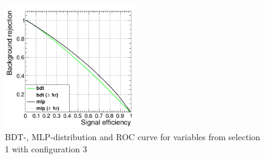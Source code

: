 \documentclass[11pt]{scrartcl}
\begin{document}
\begin{figure}[H]
\begin{minipage}{.5\textwidth}
	  \label{fig:distr_s1_config3_mlp}
	\end{minipage}
	\centering
	\includegraphics[width=0.5\textwidth]{figures/MVA/select1/config3/FOM_selection1_nL10_nT1000_mD5_nC50.png}
	\caption{BDT-, MLP-distribution and ROC curve for variables from selection 1 with configuration 3}
	 \label{fig:ROC_s1_config3}	
	\end{figure}
\end{document}
